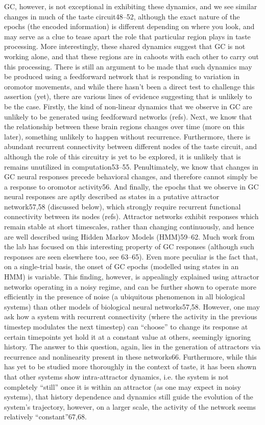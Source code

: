 \begin{refsection}
GC, however, is not exceptional in exhibiting these dynamics, and we see similar changes in much of the taste circuit48–52, although the exact nature of the epochs (the encoded information) is different depending on where you look, and may serve as a clue to tease apart the role that particular region plays in taste processing. More interestingly, these shared dynamics suggest that GC is not working alone, and that these regions are in cahoots with each other to carry out this processing. There is still an argument to be made that such dynamics may be produced using a feedforward network that is responding to variation in oromotor movements, and while there hasn’t been a direct test to challenge this assertion (yet), there are various lines of evidence suggesting that is unlikely to be the case. Firstly, the kind of non-linear dynamics that we observe in GC are unlikely to be generated using feedforward networks (refs). Next, we know that the relationship between these brain regions changes over time (more on this later), something unlikely to happen without recurrence. Furthermore, there is abundant recurrent connectivity between different nodes of the taste circuit, and although the role of this circuitry is yet to be explored, it is unlikely that is remains unutilized in computation53–55. Penultimately, we know that changes in GC neural responses precede behavioral changes, and therefore cannot simply be a response to oromotor activity56. And finally, the epochs that we observe in GC neural responses are aptly described as states in a putative attractor network57,58 (discussed below), which strongly require recurrent functional connectivity between its nodes (refs).
Attractor networks exhibit responses which remain stable at short timescales, rather than changing continuously, and hence are well described using Hidden Markov Models (HMM)59–62. Much work from the lab has focused on this interesting property of GC responses (although such responses are seen elsewhere too, see 63–65). Even more peculiar is the fact that, on a single-trial basis, the onset of GC epochs (modelled using states in an HMM) is variable. This finding, however, is appealingly explained using attractor networks operating in a noisy regime, and can be further shown to operate more efficiently in the presence of noise (a ubiquitous phenomenon in all biological systems) than other models of biological neural networks57,58.
However, one may ask how a system with recurrent connectivity (where the activity in the previous timestep modulates the next timestep) can “choose” to change its response at certain timepoints yet hold it at a constant value at others, seemingly ignoring history. The answer to this question, again, lies in the generation of attractors via recurrence and nonlinearity present in these networks66. Furthermore, while this has yet to be studied more thoroughly in the context of taste, it has been shown that other systems show intra-attractor dynamics, i.e. the system is not completely “still” once it is within an attractor (as one may expect in noisy systems), that history dependence and dynamics still guide the evolution of the system’s trajectory, however, on a larger scale, the activity of the network seems relatively “constant”67,68.


\end{refsection}
